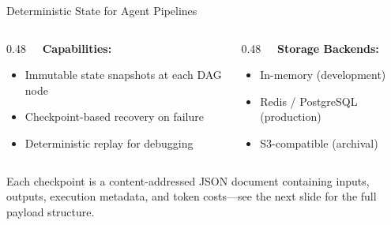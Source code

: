 \begin{frame}{Deterministic State for Agent Pipelines}
  \fontsize{6}{7}\selectfont
  \begin{columns}[T]
    \begin{column}{0.48\textwidth}
      \textbf{\ \ Capabilities:}
      \begin{itemize}
        \item Immutable state snapshots at each DAG node
        \item Checkpoint-based recovery on failure
        \item Deterministic replay for debugging
      \end{itemize}
    \end{column}
    \begin{column}{0.48\textwidth}
      \textbf{\ \ Storage Backends:}
      \begin{itemize}
        \item In-memory (development)
        \item Redis / PostgreSQL (production)
        \item S3-compatible (archival)
      \end{itemize}
    \end{column}
  \end{columns}

  \vspace{-0.1cm}

  \begin{exampleblock}{}
    \fontsize{6}{7}\selectfont
    Each checkpoint is a content-addressed JSON document containing inputs, outputs,
    execution metadata, and token costs---see the next slide for the full payload structure.
  \end{exampleblock}
\end{frame}
